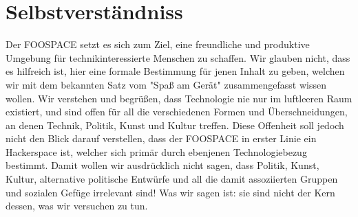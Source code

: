 \documentclass[10pt,a4paper]{article}
\begin{document}
\section*{Selbstverständniss}

Der FOOSPACE setzt es sich zum Ziel, eine freundliche und produktive Umgebung
für technikinteressierte Menschen zu schaffen. Wir glauben nicht, dass es
hilfreich ist, hier eine formale Bestimmung für jenen Inhalt zu geben, welchen
wir mit dem bekannten Satz vom "Spaß am Gerät" zusammengefasst wissen wollen.
Wir verstehen und begrüßen, dass Technologie nie nur im luftleeren Raum
existiert, und sind offen für all die verschiedenen Formen und Überschneidungen,
an denen Technik, Politik, Kunst und Kultur treffen.
Diese Offenheit soll jedoch nicht den Blick darauf verstellen, dass der FOOSPACE in
erster Linie ein Hackerspace ist, welcher sich primär durch ebenjenen Technologiebezug bestimmt. Damit wollen wir ausdrücklich nicht sagen, dass
Politik, Kunst, Kultur, alternative politische Entwürfe und all die damit
assoziierten Gruppen und sozialen Gefüge irrelevant sind! Was wir sagen ist:
sie sind nicht der Kern dessen, was wir versuchen zu tun.
\end{document}
